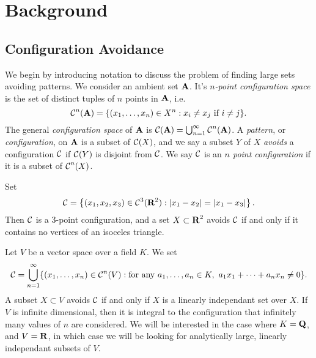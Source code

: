 
\chapter{Background}
\label{ch:Background}

\section{Configuration Avoidance}

We begin by introducing notation to discuss the problem of finding large sets avoiding patterns. We consider an ambient set $\operatorname{\mathbf{A}}$. It's \emph{$n$-point configuration space} is the set of distinct tuples of $n$ points in $\operatorname{\mathbf{A}}$, i.e.
%
\[ \operatorname{\mathcal{C}}^n(\operatorname{\mathbf{A}}) = \{ (x_1, \dots, x_n) \in X^n: x_i \neq x_j\ \text{if $i \neq j$} \}. \]
%
The general \emph{configuration space} of $\operatorname{\mathbf{A}}$ is $\operatorname{\mathcal{C}}(\operatorname{\mathbf{A}}) = \bigcup_{n = 1}^\infty \operatorname{\mathcal{C}}^n(\operatorname{\mathbf{A}})$. A \emph{pattern}, or \emph{configuration}, on $\operatorname{\mathbf{A}}$ is a subset of $\operatorname{\mathcal{C}}(X)$, and we say a subset $Y$ of $X$ \emph{avoids} a configuration $\operatorname{\mathcal{C}}$ if $\operatorname{\mathcal{C}}(Y)$ is disjoint from $\operatorname{\mathcal{C}}$. We say $\operatorname{\mathcal{C}}$ is an \emph{$n$ point configuration} if it is a subset of $\operatorname{\mathcal{C}}^n(X)$.

\begin{example}
	Set
	\[ \operatorname{\mathcal{C}} = \left\{ (x_1, x_2, x_3) \in \operatorname{\mathcal{C}}^3(\operatorname{\mathbf{R}}^2) : |x_1-x_2| = |x_1-x_3| \right\}. \]
	Then $\operatorname{\mathcal{C}}$ is a 3-point configuration, and a set $X \subset \operatorname{\mathbf{R}}^2$ avoids $\operatorname{\mathcal{C}}$ if and only if it contains no vertices of an isoceles triangle. %
\end{example}

\begin{example}
	Let $V$ be a vector space over a field $K$. We set
	\[ \operatorname{\mathcal{C}} = \bigcup_{n = 1}^\infty \{ (x_1, \dots, x_n) \in \operatorname{\mathcal{C}}^n(V): \text{for any}\ a_1, \dots, a_n \in K,\ a_1x_1 + \dots + a_nx_n \neq 0 \}. \]
	A subset $X \subset V$ avoids $\operatorname{\mathcal{C}}$ if and only if $X$ is a linearly independant set over $X$. If $V$ is infinite dimensional, then it is integral to the configuration that infinitely many values of $n$ are considered. We will be interested in the case where $K = \operatorname{\mathbf{Q}}$, and $V = \operatorname{\mathbf{R}}$, in which case we will be looking for analytically large, linearly independant subsets of $V$.
\end{example}

